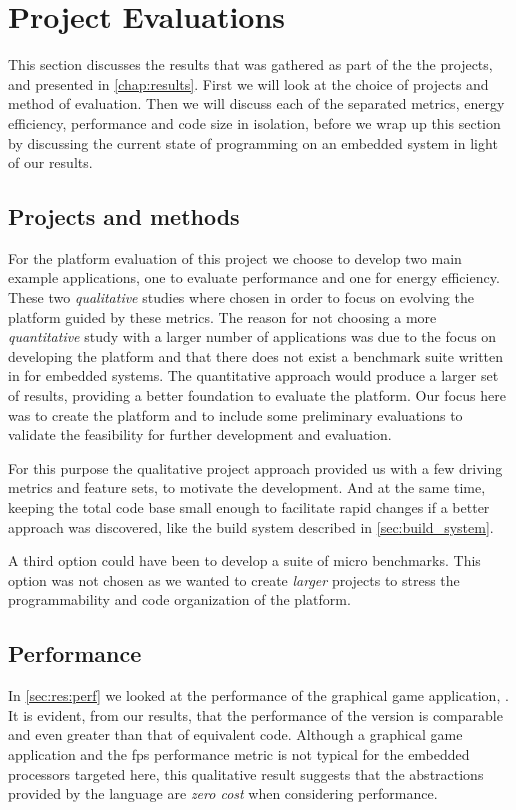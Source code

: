 
\section{Project Evaluations}
\label{sec:disc:project_evaluations}

This section discusses the results that was gathered as part of the {\tracker} the {\cg} projects, and presented in \autoref{chap:results}.
First we will look at the choice of projects and method of evaluation.
Then we will discuss each of the separated metrics, energy efficiency, performance and code size in isolation, before we wrap up this section by discussing the current state of {\rust} programming on an embedded system in light of our results.

\subsection{Projects and methods}

For the platform evaluation of this project we choose to develop two main example applications, one to evaluate performance and one for energy efficiency.
These two \emph{qualitative} studies where chosen in order to focus on evolving the platform guided by these metrics.
The reason for not choosing a more \emph{quantitative} study with a larger number of applications was due to the focus on developing the platform and that there does not exist a benchmark suite written in {\rust} for embedded systems.
The quantitative approach would produce a larger set of results, providing a better foundation to evaluate the platform.
Our focus here was to create the platform and to include some preliminary evaluations to validate the feasibility for further development and evaluation.

For this purpose the qualitative project approach provided us with a few driving metrics and feature sets, to motivate the development.
And at the same time, keeping the total code base small enough to facilitate rapid changes if a better approach was discovered, like the build system described in \autoref{sec:build_system}.

A third option could have been to develop a suite of micro benchmarks.
This option was not chosen as we wanted to create \emph{larger} projects to stress the programmability and code organization of the platform.

\subsection{Performance}
In \autoref{sec:res:perf} we looked at the performance of the graphical game application, {\cg}.
It is evident, from our results, that the performance of the {\rust} version is comparable and even greater than that of equivalent {\C} code.
Although a graphical game application and the \gls{fps} performance metric is not typical for the embedded processors targeted here, this qualitative result suggests that the abstractions provided by the {\rust} language are \emph{zero cost} when considering performance.

